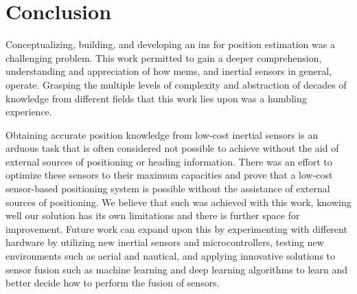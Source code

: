 \section{Conclusion}
Conceptualizing, building, and developing an \acrfull{ins} for position estimation was a challenging problem. This work permitted to gain a deeper comprehension, understanding and appreciation of how \acrfull{mems}, and inertial sensors in general, operate. Grasping the multiple levels of complexity and abstraction of decades of knowledge from different fields that this work lies upon was a humbling experience.

Obtaining accurate position knowledge from low-cost inertial sensors is an arduous task that is often considered not possible to achieve without the aid of external sources of positioning or heading information. There was an effort to optimize these sensors to their maximum capacities and prove that a low-cost sensor-based positioning system is possible without the assistance of external sources of positioning. We believe that such was achieved with this work, knowing well our solution has its own limitations and there is further space for improvement. Future work can expand upon this by experimenting with different hardware by utilizing new inertial sensors and microcontrollers, testing new environments such as aerial and nautical, and applying innovative solutions to sensor fusion such as machine learning and deep learning algorithms to learn and better decide how to perform the fusion of sensors.